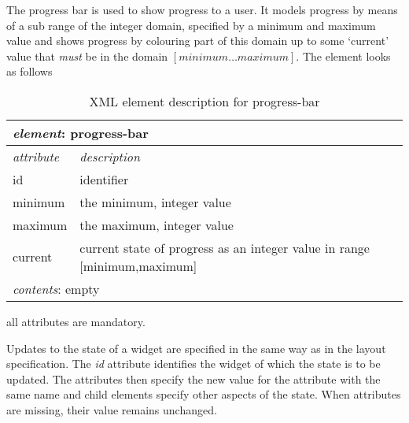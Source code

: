 \documentclass{article}
\begin{document}

   \noindent The progress bar is used to show progress to a user. It models progress by
   means of a sub range of the integer domain, specified by a minimum and
   maximum value and shows progress by colouring part of this domain up to some
   `current' value that \emph{must} be in the domain $[ minimum \ldots maximum
   ]$. The element looks as follows

    \begin{table}[H]
     \begin{center}
     \begin{tabular}{|l|l|}
       \hline
        \multicolumn{2}{|l|}{\textit{element}: progress-bar} \\
       \hline \hline
        \textit{attribute} & \textit{description} \\
       \hline
        id                 & identifier \\
        minimum            & the minimum, integer value \\
        maximum            & the maximum, integer value \\
        current            & current state of progress as an integer value in range [minimum,maximum]  \\
       \hline \hline
        \multicolumn{2}{|l|}{\textit{contents}: empty} \\
       \hline
     \end{tabular}
     \end{center}
     \label{figure:element_progress_bar}
     \caption{XML element description for progress-bar}
    \end{table}

   \noindent all attributes are mandatory.

%
   \noindent Updates to the state of a widget are specified in the same way as
   in the layout specification. The \textit{id} attribute identifies the
   widget of which the state is to be updated. The attributes then specify the
   new value for the attribute with the same name and child elements specify
   other aspects of the state. When attributes are missing, their value remains
   unchanged.
\end{document}
